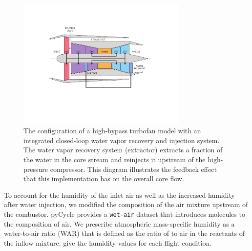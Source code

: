 \documentclass[conf]{new-aiaa}
\begin{document}
\begin{figure}[hbt!]
    \centering
    \includegraphics[width=0.75\textwidth]{turbofan_wvr.pdf}
    \caption{
        The configuration of a high-bypass turbofan model with an integrated closed-loop water vapor recovery and injection system.
        The water vapor recovery system (extractor) extracts a fraction of the water in the core stream and reinjects it upstream of the high-pressure compressor.
        This diagram illustrates the feedback effect that this implementation has on the overall core flow.}
    \label{fig:n3_cycle}
\end{figure}

To account for the humidity of the inlet air as well as the increased humidity after water injection, we modified the composition of the air mixture upstream of the combustor.
pyCycle provides a \texttt{wet-air} dataset that introduces  molecules to the composition of air.
We prescribe atmospheric mass-specific humidity as a water-to-air ratio (WAR) that is defined as the ratio of  to air in the reactants of the inflow mixture.
\citet{Kalnay1996} give the humidity values for each flight condition.
\end{document}
